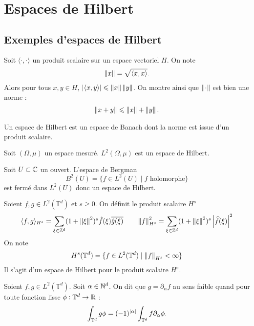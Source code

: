 \documentclass[twocolumn, landscape]{article}
\begin{document}
\section{Espaces de Hilbert}

\subsection{Exemples d'espaces de Hilbert}

\begin{prop}
    Soit $\langle \cdot, \cdot \rangle$ un produit scalaire sur un espace vectoriel $H$. On note $$\left\lVert x \right\rVert = \sqrt{\langle x, x \rangle}.$$
    Alors pour tous $x,y \in H$, $\left\lvert \langle x, y \rangle \right\rvert \leqslant \left\lVert x \right\rVert \left\lVert y \right\rVert$. On montre ainsi que $\left\lVert \cdot \right\rVert$ est bien une norme : $$\left\lVert x + y \right\rVert \leqslant \left\lVert x \right\rVert +\left\lVert y \right\rVert.$$
\end{prop}

\begin{defi}
    Un espace de Hilbert est un espace de Banach dont la norme est issue d'un produit scalaire.
\end{defi}

\begin{exem}
    Soit $(\Omega, \mu)$ un espace mesuré. $L^2(\Omega, \mu)$ est un espace de Hilbert.
\end{exem}

\begin{exem}
    Soit $U \subset \mathbb{C}$ un ouvert. L'espace de Bergman $$B^2(U) = \{f \in L^2(U) \mid f \text{ holomorphe}\}$$est fermé dans $L^2(U)$ donc un espace de Hilbert.
\end{exem}

\begin{exem}
    Soient $f,g \in L^2(\mathbb{T}^d)$ et $s \geq 0$. On définit le produit scalaire $H^s$ $$\langle f, g\rangle_{H^s} = \sum_{\xi \in \mathbb{Z}^d} (1 + \left\lVert \xi \right\rVert^2)^s \hat{f}(\xi) \overline{\hat{g}(\xi)} \qquad \left\lVert f \right\rVert^2_{H^s} = \sum_{\xi \in \mathbb{Z}^d} (1 + \left\lVert \xi \right\rVert^2)^s \left\lvert \widehat{f}(\xi) \right\rvert^2$$
    On note $$H^s(\mathbb{T}^d) = \{f\in L^2(\mathbb{T}^d) \mid \left\lVert f \right\rVert_{H^s} < \infty\}$$
    Il s'agit d'un espace de Hilbert pour le produit scalaire $H^s$.
\end{exem}

\begin{defi}
    Soient $f,g \in L^2(\mathbb{T}^d)$. Soit $\alpha \in \mathbb{N}^d$. On dit que $g = \partial_\alpha f$ au sens faible quand pour toute fonction lisse $\phi : \mathbb{T}^d \to \mathbb{R}$ : $$\int_{\mathbb{T}^d} g \phi = (-1)^{\left\lvert \alpha \right\rvert} \int_{\mathbb{T}^d} f \partial_{\alpha} \phi.$$
\end{defi}
\end{document}
